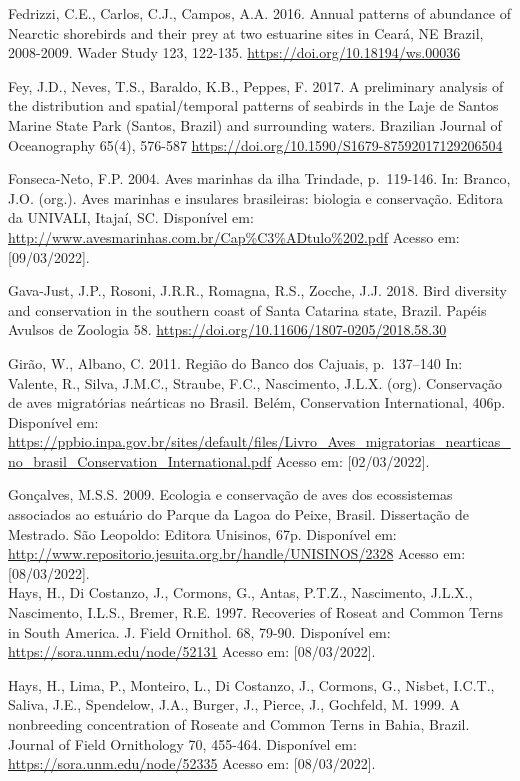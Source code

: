 \documentclass[
  oneside]{scrbook}
\begin{document}
Fedrizzi, C.E., Carlos, C.J., Campos, A.A. 2016. Annual patterns of abundance of Nearctic shorebirds and their prey at two estuarine sites in Ceará, NE Brazil, 2008-2009. Wader Study 123, 122-135. \url{https://doi.org/10.18194/ws.00036}

Fey, J.D., Neves, T.S., Baraldo, K.B., Peppes, F. 2017. A preliminary analysis of the distribution and spatial/temporal patterns of seabirds in the Laje de Santos Marine State Park (Santos, Brazil) and surrounding waters. Brazilian Journal of Oceanography 65(4), 576-587 \url{https://doi.org/10.1590/S1679-87592017129206504}

Fonseca-Neto, F.P. 2004. Aves marinhas da ilha Trindade, p.~119-146. In: Branco, J.O. (org.). Aves marinhas e insulares brasileiras: biologia e conservação. Editora da UNIVALI, Itajaí, SC. Disponível em: \url{http://www.avesmarinhas.com.br/Cap\%C3\%ADtulo\%202.pdf} Acesso em: {[}09/03/2022{]}.

Gava-Just, J.P., Rosoni, J.R.R., Romagna, R.S., Zocche, J.J. 2018. Bird diversity and conservation in the southern coast of Santa Catarina state, Brazil. Papéis Avulsos de Zoologia 58. \url{https://doi.org/10.11606/1807-0205/2018.58.30}

Girão, W., Albano, C. 2011. Região do Banco dos Cajuais, p.~137--140 In: Valente, R., Silva, J.M.C., Straube, F.C., Nascimento, J.L.X. (org). Conservação de aves migratórias neárticas no Brasil. Belém, Conservation International, 406p. Disponível em: \url{https://ppbio.inpa.gov.br/sites/default/files/Livro_Aves_migratorias_nearticas_no_brasil_Conservation_International.pdf} Acesso em: {[}02/03/2022{]}.

Gonçalves, M.S.S. 2009. Ecologia e conservação de aves dos ecossistemas associados ao estuário do Parque da Lagoa do Peixe, Brasil. Dissertação de Mestrado. São Leopoldo: Editora Unisinos, 67p. Disponível em: \url{http://www.repositorio.jesuita.org.br/handle/UNISINOS/2328} Acesso em: {[}08/03/2022{]}.\\
Hays, H., Di Costanzo, J., Cormons, G., Antas, P.T.Z., Nascimento, J.L.X., Nascimento, I.L.S., Bremer, R.E. 1997. Recoveries of Roseat and Common Terns in South America. J. Field Ornithol. 68, 79-90. Disponível em: \url{https://sora.unm.edu/node/52131} Acesso em: {[}08/03/2022{]}.

Hays, H., Lima, P., Monteiro, L., Di Costanzo, J., Cormons, G., Nisbet, I.C.T., Saliva, J.E., Spendelow, J.A., Burger, J., Pierce, J., Gochfeld, M. 1999. A nonbreeding concentration of Roseate and Common Terns in Bahia, Brazil. Journal of Field Ornithology 70, 455-464. Disponível em: \url{https://sora.unm.edu/node/52335} Acesso em: {[}08/03/2022{]}.
\end{document}
